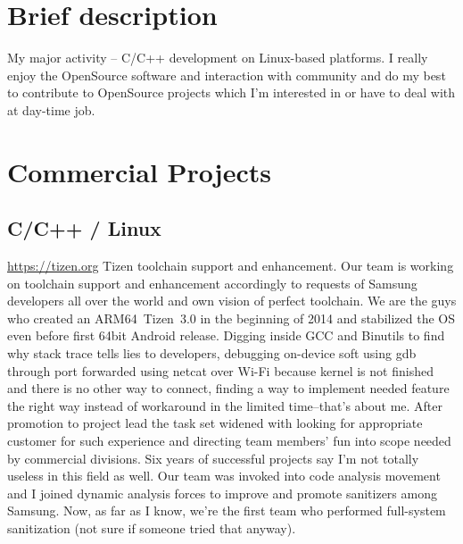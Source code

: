\documentclass[11pt,a4paper]{moderncv}
\begin{document}
\maketitle

\section{Brief description}
\cvitem {} {My major activity -- C/C++ development on Linux-based platforms.\newline{} I really enjoy the OpenSource
  software and interaction with community and do my best to contribute to OpenSource projects which I'm interested in or
  have to deal with at day-time job.}
\section{Commercial Projects}
  \subsection{C/C++ / Linux}
  {\url{https://tizen.org}\newline{}
    Tizen toolchain support and enhancement.\newline{}
    Our team is working on toolchain support and enhancement accordingly to requests of Samsung developers all over the
    world and own vision of perfect toolchain. We are the guys who created an ARM64~Tizen~3.0 in the beginning of 2014
    and stabilized the OS even before first 64bit Android release.\newline{}
    Digging inside GCC and Binutils to find why stack trace tells lies to developers, debugging on-device soft using gdb
    through port forwarded using netcat over Wi-Fi because kernel is not finished and there is no other way to connect,
    finding a way to implement needed feature the right way instead of workaround in the limited time--that's about me.
    \newline{}
    After promotion to project lead the task set widened with looking for appropriate customer for such experience
    and directing team members' fun into scope needed by commercial divisions. Six years of successful projects say
    I'm not totally useless in this field as well.\newline{}
    Our team was invoked into code analysis movement and I joined dynamic analysis forces to improve and promote sanitizers
    among Samsung. Now, as far as I know, we're the first team who performed full-system sanitization (not sure if someone
    tried that anyway).
  }
\end{document}

